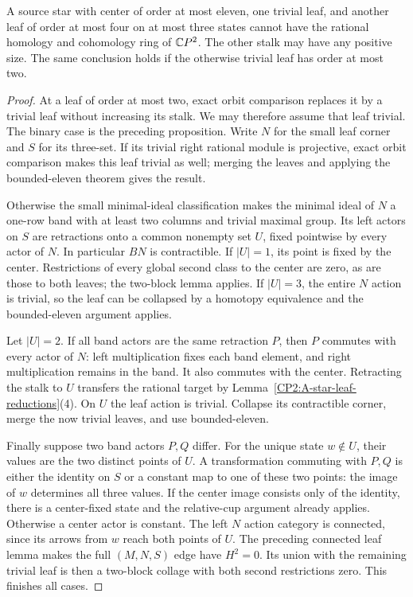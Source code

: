\begin{proposition}
\label{CP2:A-star-small-three-leaf}
A source star with center of order at most eleven, one
trivial leaf, and another leaf of order at most four on
at most three states cannot have the rational homology
and cohomology ring of $\mathbb{C}P^2$. The other stalk may have
any positive size. The same conclusion holds if the
otherwise trivial leaf has order at most two.
\end{proposition}
\begin{proof}
At a leaf of order at most two, exact orbit comparison
replaces it by a trivial leaf without increasing its
stalk. We may therefore assume that leaf trivial.
The binary case is the preceding proposition. Write
$N$ for the small leaf corner and $S$ for its three-set.
If its trivial right rational module is projective,
exact orbit comparison makes this leaf trivial as well;
merging the leaves and applying the bounded-eleven theorem
gives the result.

Otherwise the small minimal-ideal classification makes
the minimal ideal of $N$ a one-row band with at least
two columns and trivial maximal group. Its left actors
on $S$ are retractions onto a common nonempty set $U$,
fixed pointwise by every actor of $N$. In particular
$BN$ is contractible. If $|U|=1$, its point is fixed by
the center. Restrictions of every global second class
to the center are zero, as are those to both leaves;
the two-block lemma applies. If $|U|=3$, the entire
$N$ action is trivial, so the leaf can be collapsed by
a homotopy equivalence and the bounded-eleven argument
applies.

Let $|U|=2$. If all band actors are the same retraction
$P$, then $P$ commutes with every actor of $N$: left
multiplication fixes each band element, and right
multiplication remains in the band. It also commutes
with the center. Retracting the stalk to $U$ transfers
the rational target by Lemma~\ref{CP2:A-star-leaf-reductions}(4).
On $U$ the leaf action is trivial. Collapse its contractible
corner, merge the now trivial leaves, and use bounded-eleven.

Finally suppose two band actors $P,Q$ differ. For the
unique state $w\notin U$, their values are the two distinct
points of $U$. A transformation commuting with $P,Q$ is
either the identity on $S$ or a constant map to one of
these two points: the image of $w$ determines all three
values. If the center image consists only of the identity,
there is a center-fixed state and the relative-cup argument
already applies. Otherwise a center actor is constant.
The left $N$ action category is connected, since its arrows
from $w$ reach both points of $U$. The preceding connected
leaf lemma makes the full $(M,N,S)$ edge have $H^2=0$.
Its union with the remaining trivial leaf is then a
two-block collage with both second restrictions zero.
This finishes all cases.
\end{proof}

